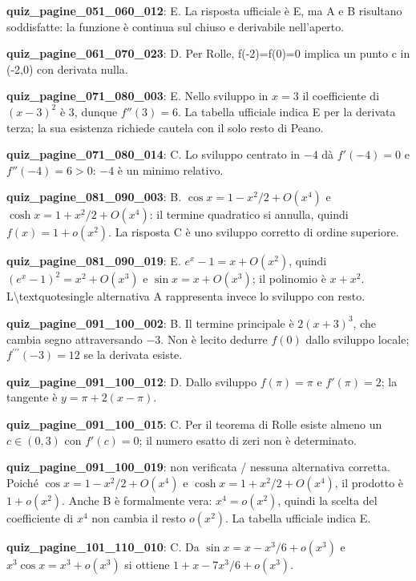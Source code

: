 \documentclass[11pt,a4paper]{article}
\newcounter{quiz}
\begin{document}
\noindent\textbf{quiz\_pagine\_051\_060\_012}: E. La risposta ufficiale è E, ma A e B risultano soddisfatte: la funzione è continua sul chiuso e derivabile nell'aperto.\par\medskip
\noindent\textbf{quiz\_pagine\_061\_070\_023}: D. Per Rolle, f(-2)=f(0)=0 implica un punto c in (-2,0) con derivata nulla.\par\medskip
\noindent\textbf{quiz\_pagine\_071\_080\_003}: E. Nello sviluppo in $x=3$ il coefficiente di $(x-3)^2$ è $3$, dunque $f''(3)=6$. La tabella ufficiale indica E per la derivata terza; la sua esistenza richiede cautela con il solo resto di Peano.\par\medskip
\noindent\textbf{quiz\_pagine\_071\_080\_014}: C. Lo sviluppo centrato in $-4$ dà $f'(-4)=0$ e $f''(-4)=6>0$: $-4$ è un minimo relativo.\par\medskip
\noindent\textbf{quiz\_pagine\_081\_090\_003}: B. $\cos x=1-x^2/2+O(x^4)$ e $\cosh x=1+x^2/2+O(x^4)$: il termine quadratico si annulla, quindi $f(x)=1+o(x^2)$. La risposta C è uno sviluppo corretto di ordine superiore.\par\medskip
\noindent\textbf{quiz\_pagine\_081\_090\_019}: E. $e^x-1=x+O(x^2)$, quindi $(e^x-1)^2=x^2+O(x^3)$ e $\sin x=x+O(x^3)$; il polinomio è $x+x^2$. L\textbackslash{}textquotesingle alternativa A rappresenta invece lo sviluppo con resto.\par\medskip
\noindent\textbf{quiz\_pagine\_091\_100\_002}: B. Il termine principale è $2(x+3)^3$, che cambia segno attraversando $-3$. Non è lecito dedurre $f(0)$ dallo sviluppo locale; $f^{\prime\prime\prime}(-3)=12$ se la derivata esiste.\par\medskip
\noindent\textbf{quiz\_pagine\_091\_100\_012}: D. Dallo sviluppo $f(\pi)=\pi$ e $f\prime(\pi)=2$; la tangente è $y=\pi+2(x-\pi)$.\par\medskip
\noindent\textbf{quiz\_pagine\_091\_100\_015}: C. Per il teorema di Rolle esiste almeno un $c\in(0,3)$ con $f\prime(c)=0$; il numero esatto di zeri non è determinato.\par\medskip
\noindent\textbf{quiz\_pagine\_091\_100\_019}: non verificata / nessuna alternativa corretta. Poiché $\cos x=1-x^2/2+O(x^4)$ e $\cosh x=1+x^2/2+O(x^4)$, il prodotto è $1+o(x^2)$. Anche B è formalmente vera: $x^4=o(x^2)$, quindi la scelta del coefficiente di $x^4$ non cambia il resto $o(x^2)$. La tabella ufficiale indica E.\par\medskip
\noindent\textbf{quiz\_pagine\_101\_110\_010}: C. Da $\sin x=x-x^3/6+o(x^3)$ e $x^3\cos x=x^3+o(x^3)$ si ottiene $1+x-7x^3/6+o(x^3)$.\par\medskip
\end{document}
